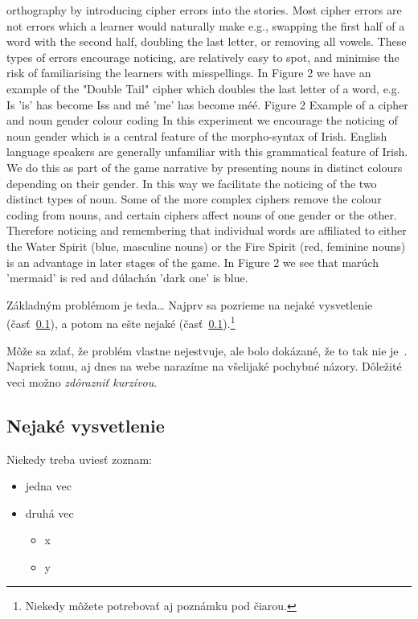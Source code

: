 \documentclass[10pt,twoside,english,a4paper]{article}
\begin{document}
orthography by introducing cipher errors into the stories. Most cipher errors are not errors which a learner would naturally make e.g., swapping the first half of a word with the second half, doubling the last letter, or removing all vowels. These types of errors encourage noticing, are relatively easy to spot, and minimise the risk of familiarising the learners with misspellings. In Figure 2 we have an example of the "Double Tail" cipher which doubles the last letter of a word, e.g. Is 'is' has become Iss and mé 'me' has become méé. Figure 2 Example of a cipher and noun gender colour coding In this experiment we encourage the noticing of noun gender which is a central feature of the morpho-syntax of Irish. English language speakers are generally unfamiliar with this grammatical feature of Irish. We do this as part of the game narrative by presenting nouns in distinct colours depending on their gender. In this way we facilitate the noticing of the two distinct types of noun. Some of the more complex ciphers remove the colour coding from nouns, and certain ciphers affect nouns of one gender or the other. Therefore noticing and remembering that individual words are affiliated to either the Water Spirit (blue, masculine nouns) or the Fire Spirit (red, feminine nouns) is an advantage in later stages of the game. In Figure 2 we see that marúch 'mermaid' is red and dúlachán 'dark one' is blue.


Základným problémom je teda\ldots{} Najprv sa pozrieme na nejaké vysvetlenie (časť~\ref{ina:nejake}), a potom na ešte nejaké (časť~\ref{ina:nejake}).\footnote{Niekedy môžete potrebovať aj poznámku pod čiarou.}

Môže sa zdať, že problém vlastne nejestvuje\cite{Coplien:MPD}, ale bolo dokázané, že to tak nie je~\cite{Czarnecki:Staged, Czarnecki:Progress}. Napriek tomu, aj dnes na webe narazíme na všelijaké pochybné názory\cite{PLP-Framework}. Dôležité veci možno \emph{zdôrazniť kurzívou}.
\subsection{Nejaké vysvetlenie} \label{ina:nejake}

Niekedy treba uviesť zoznam:

\begin{itemize}
\item jedna vec
\item druhá vec
	\begin{itemize}
	\item x
	\item y
	\end{itemize}
\end{itemize}
\end{document}
